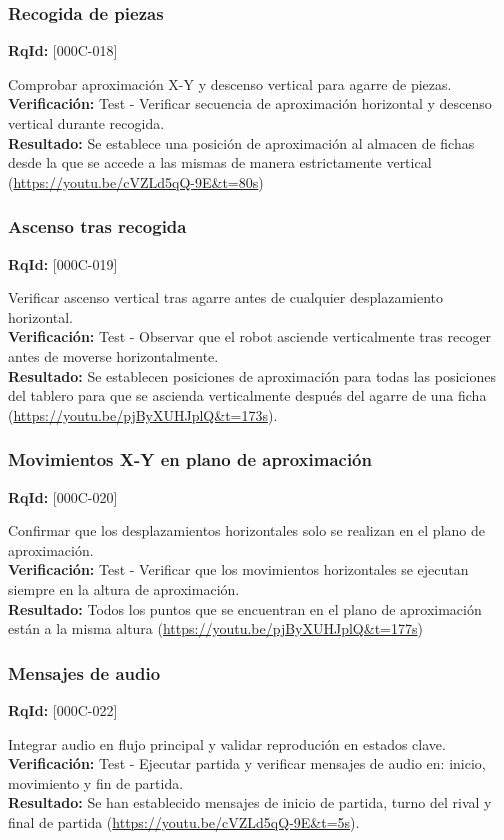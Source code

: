 \documentclass[12pt,a4paper]{article}
\begin{document}
\subsubsection{Recogida de piezas}
\textbf{RqId:} [000C-018]
\vspace{0.3em}
\par Comprobar aproximación X-Y y descenso vertical para agarre de piezas.
\\ \textbf{Verificación:} Test - Verificar secuencia de aproximación horizontal y descenso vertical durante recogida.
\\ \textbf{Resultado:} Se establece una posición de aproximación al almacen de fichas desde la que se accede a las mismas de manera estrictamente vertical (\url{https://youtu.be/cVZLd5qQ-9E&t=80s})

\subsubsection{Ascenso tras recogida}
\textbf{RqId:} [000C-019]
\vspace{0.3em}
\par Verificar ascenso vertical tras agarre antes de cualquier desplazamiento horizontal.
\\ \textbf{Verificación:} Test - Observar que el robot asciende verticalmente tras recoger antes de moverse horizontalmente.
\\ \textbf{Resultado:} Se establecen posiciones de aproximación para todas las posiciones del tablero para que se ascienda verticalmente después del agarre de una ficha (\url{https://youtu.be/pjByXUHJplQ&t=173s}).

\subsubsection{Movimientos X-Y en plano de aproximación}
\textbf{RqId:} [000C-020]
\vspace{0.3em}
\par Confirmar que los desplazamientos horizontales solo se realizan en el plano de aproximación.
\\ \textbf{Verificación:} Test - Verificar que los movimientos horizontales se ejecutan siempre en la altura de aproximación.
\\ \textbf{Resultado:} Todos los puntos que se encuentran en el plano de aproximación están a la misma altura (\url{https://youtu.be/pjByXUHJplQ&t=177s})

\subsubsection{Mensajes de audio}
\textbf{RqId:} [000C-022]
\vspace{0.3em}
\par Integrar audio en flujo principal y validar reprodución en estados clave.
\\ \textbf{Verificación:} Test - Ejecutar partida y verificar mensajes de audio en: inicio, movimiento y fin de partida.
\\ \textbf{Resultado:} Se han establecido mensajes de inicio de partida, turno del rival y final de partida (\url{https://youtu.be/cVZLd5qQ-9E&t=5s}).
\end{document}
